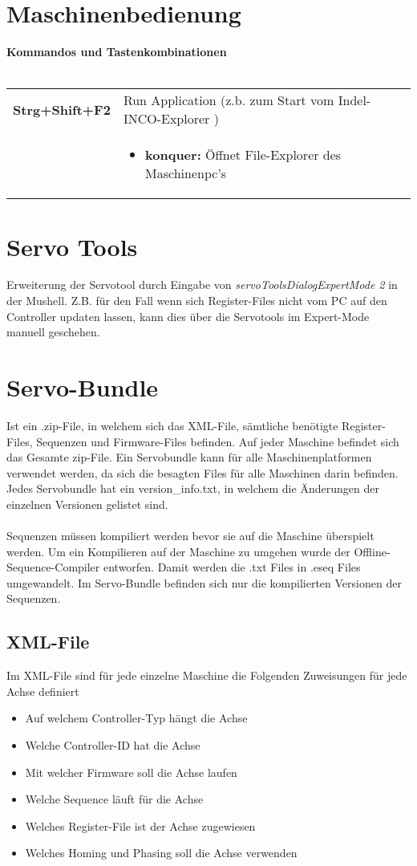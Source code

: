 \section{Maschinenbedienung}
\textbf{Kommandos und Tastenkombinationen\\\\}
\begin{tabular}{l|p{14cm}}
	\rowcolor{gray!10!white}
	\textbf{Strg+Shift+F2} & Run Application (z.b. zum Start vom Indel-INCO-Explorer )\\
	\rowcolor{gray!10!white}
	& \begin{itemize}
		\item \textbf{konquer:} Öffnet File-Explorer des Maschinenpc's
	\end{itemize}	
\end{tabular}

\section{Servo Tools}
	Erweiterung der Servotool durch Eingabe von \textit{servoToolsDialogExpertMode 2} in der Mushell. Z.B. für den Fall wenn sich Register-Files nicht vom PC auf den Controller updaten lassen, kann dies über die Servotools im Expert-Mode manuell geschehen.

\section{Servo-Bundle}
	Ist ein .zip-File, in welchem sich das XML-File, sämtliche benötigte Register-Files, Sequenzen und Firmware-Files befinden. Auf jeder Maschine befindet sich das Gesamte zip-File. Ein Servobundle kann für alle Maschinenplatformen verwendet werden, da sich die besagten Files für alle Maschinen darin befinden. Jedes Servobundle hat ein version\_info.txt, in welchem die Änderungen der einzelnen Versionen gelistet sind.\\\\ Sequenzen müssen kompiliert werden bevor sie auf die Maschine überspielt werden. Um ein Kompilieren auf der Maschine zu umgehen wurde der Offline-Sequence-Compiler entworfen. Damit werden die .txt Files in .eseq Files umgewandelt. Im Servo-Bundle befinden sich nur die kompilierten Versionen der Sequenzen.
	\subsection{XML-File}
		Im XML-File sind für jede einzelne Maschine die Folgenden Zuweisungen für jede Achse definiert
		\begin{itemize}
			\item Auf welchem Controller-Typ hängt die Achse
			\item Welche Controller-ID hat die Achse
			\item Mit welcher Firmware soll die Achse laufen
			\item Welche Sequence läuft für die Achse
			\item Welches Register-File ist der Achse zugewiesen
			\item Welches Homing und Phasing soll die Achse verwenden
		\end{itemize}